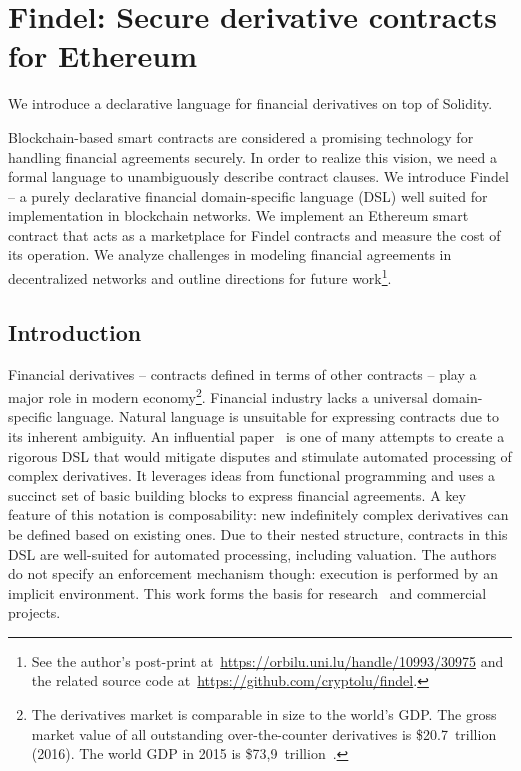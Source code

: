 \newtheorem{definition}{Definition}

\chapter{Findel: Secure derivative contracts for Ethereum}

\label{Chapter10_Findel}

We introduce a declarative language for financial derivatives on top of Solidity.


Blockchain-based smart contracts are considered a promising technology for handling financial agreements securely.
In order to realize this vision, we need a formal language to unambiguously describe contract clauses.
We introduce Findel -- a purely declarative financial domain-specific language (DSL) well suited for implementation in blockchain networks.
We implement an Ethereum smart contract that acts as a marketplace for Findel contracts and measure the cost of its operation.
We analyze challenges in modeling financial agreements in decentralized networks and outline directions for future work\footnote{See the author's post-print at~\url{https://orbilu.uni.lu/handle/10993/30975} and the related source code at~\url{https://github.com/cryptolu/findel}.}.



\section{Introduction}

Financial derivatives -- contracts defined in terms of other contracts -- play a major role in modern economy\footnote{The derivatives market is comparable in size to the world's GDP. The gross market value of all outstanding over-the-counter derivatives is \$20.7~trillion~\cite{InternationalSettlements2016} (2016). The world GDP in 2015 is \$73,9~trillion~\cite{WorldBank}.}.
Financial industry lacks a universal domain-specific language.
Natural language is unsuitable for expressing contracts due to its inherent ambiguity.
An influential paper~\cite{PeytonJones2000} is one of many attempts to create a rigorous DSL that would mitigate disputes and stimulate automated processing of complex derivatives.
It leverages ideas from functional programming and uses a succinct set of basic building blocks to express financial agreements.
A key feature of this notation is composability: new indefinitely complex derivatives can be defined based on existing ones.
Due to their nested structure, contracts in this DSL are well-suited for automated processing, including valuation.
The authors do not specify an enforcement mechanism though: execution is performed by an implicit environment.
This work forms the basis for research~\cite{Gaillourdet2011, Schuldenzucker2014} and commercial~\cite{Frankau2009} projects.

